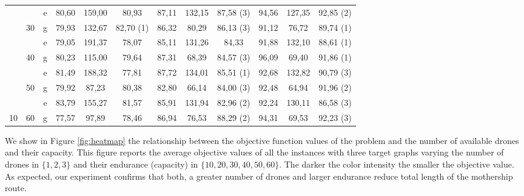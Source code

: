 \begin{table}[h!]
{\begin{tabular}{|c|c|c|ccc|ccc|ccc|}
 &  & e & 80,60 & 159,00 & 80,93 & 87,11 & 132,15 & {\color[HTML]{FE0000} 87,58 (3)} & 94,56 & 127,35 & {\color[HTML]{FE0000} 92,85 (2)} \\ \cline{3-3}
 & \multirow{-2}{*}{30} & g & 79,93 & 132,67 & {\color[HTML]{FE0000} 82,70 (1)} & 86,32 & 80,29 & {\color[HTML]{FE0000} 86,13 (3)} & 91,12 & 76,72 & {\color[HTML]{FE0000} 89,74 (1)} \\ \cline{2-12} 
 &  & e & 79,05 & 191,37 & 78,07 & 85,11 & 131,26 & 84,33 & 91,88 & 132,10 & {\color[HTML]{FE0000} 88,61 (1)} \\ \cline{3-3}
 & \multirow{-2}{*}{40} & g & 80,23 & 115,00 & 79,64 & 87,31 & 68,39 & {\color[HTML]{FE0000} 84,57 (3)} & 96,09 & 69,40 & {\color[HTML]{FE0000} 91,86 (1)} \\ \cline{2-12} 
 &  & e & 81,49 & 188,32 & 77,81 & 87,72 & 134,01 & {\color[HTML]{FE0000} 85,51 (1)} & 92,68 & 132,82 & {\color[HTML]{FE0000} 90,79 (3)} \\ \cline{3-3}
 & \multirow{-2}{*}{50} & g & 79,92 & 87,23 & 80,38 & 82,80 & 66,14 & {\color[HTML]{FE0000} 84,00 (3)} & 92,48 & 64,94 & {\color[HTML]{FE0000} 91,96 (2)} \\ \cline{2-12} 
 &  & e & 83,79 & 155,27 & 81,57 & 85,91 & 131,94 & {\color[HTML]{FE0000} 82,96 (2)} & 92,24 & 130,11 & {\color[HTML]{FE0000} 86,58 (3)} \\ \cline{3-3}
\multirow{-10}{*}{10} & \multirow{-2}{*}{60} & g & 77,57 & 97,89 & 78,46 & 86,94 & 76,53 & {\color[HTML]{FE0000} 88,29 (2)} & 94,31 & 69,53 & {\color[HTML]{FE0000} 92,23 (3)} \\ \hline
\end{tabular}%
}
\end{table}

\noindent
We show in Figure \ref{fig:heatmap} the relationship between the objective function values of the problem and the number of available drones and their capacity. This figure reports the average objective values of all the instances with three target graphs varying the number of drones in $\{1,2,3\}$ and their endurance (capacity) in $\{10,20,30,40,50,60\}$. The darker the color intensity the smaller the objective value. As expected, our experiment confirms that both, a greater number of drones and larger endurance reduce total length of the mothership route.

